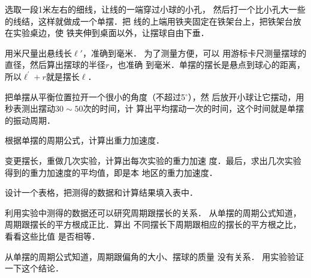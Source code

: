 选取一段1米左右的细线，让线的一端穿过小球的小孔，
然后打一个比小孔大一些的线结，这样就做成一个单摆．把
线的上端用铁夹固定在铁架台上，把铁架台放在实验桌边，使
铁夹伸到桌面以外，让摆球自由下垂．

用米尺量出悬线长$\ell'$，准确到毫米．
为了测量方便，可以
用游标卡尺测量摆球的直径，然后算出摆球的半径$r$，也准确
到毫米．单摆的摆长是悬点到球心的距离，所以$\ell^{\prime}+r$就是摆长$\ell$．

把单摆从平衡位置拉开一个很小的角度（不超过5$^\circ$），然
后放开小球让它摆动，用秒表测出摆动$30 \sim 50$次的时间，计
算出平均摆动一次的时间，这个时间就是单摆的振动周期．

根据单摆的周期公式，计算出重力加速度．

变更摆长，重做几次实验，计算出每次实验的重力加速
度．最后，求出几次实验得到的重力加速度的平均值，即是本
地区的重力加速度．

设计一个表格，把测得的数据和计算结果填入表中．

利用实验中测得的数据还可以研究周期跟摆长的关系．
从单摆的周期公式知道，周期跟摆长的平方根成正比．算出
不同摆长下周期跟相应的摆长的平方根之比，看看这些比值
是否相等．

从单摆的周期公式知道，周期跟偏角的大小、摆球的质量
没有关系．
用实验验证一下这个结论．


